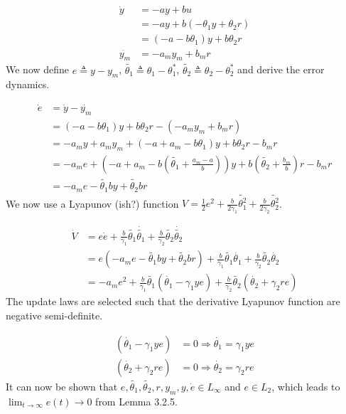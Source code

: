 \begin{equation}
\begin{split}
\dot{y} &= -ay +bu \\
& =-ay + b (-\theta_1 y + \theta_2 r) \\
& = (-a- b \theta_1) y + b \theta_2 r \\
\dot{y_m} &= -a_m y_m + b_m r
\end{split}
\end{equation}
We now define $e \triangleq y - y_m$, $\tilde{\theta_1}  \triangleq \theta_1 - \theta_1^*$, $\tilde{\theta_2}  \triangleq \theta_2 - \theta_2^*$ and derive the error dynamics.

\begin{equation}
\begin{split}
\dot{e} &= \dot{y}-\dot{y_m} \\
&= (-a- b \theta_1) y + b \theta_2 r - ( -a_m y_m + b_m r ) \\
&= -a_m y +  a_m y_m + (-a + a_m- b \theta_1) y + b \theta_2 r - b_m r \\
&= -a_m e + (-a + a_m- b (\tilde{\theta_1} +\frac{a_m-a}{b})) y + b (\tilde{\theta_2} + \frac{b_m}{b})r - b_m r \\
&= -a_m e - \tilde{\theta_1}b y + \tilde{\theta_2}b r
\end{split}
\end{equation}
We now use a Lyapunov (ish?) function $V = \frac{1}{2}e^2 + \frac{b}{2\gamma_1}\tilde{\theta_1^2} + \frac{b}{2\gamma_2}\tilde{\theta_2^2} $.

\begin{equation}
\begin{split}
\dot{V} &= e\dot{e} 	+ \frac{b}{\gamma_1}\tilde{\theta_1}\dot{\tilde{\theta_1}} 
				+ \frac{b}{\gamma_2} \tilde{\theta_2}\dot{\tilde{\theta_2}} \\
&= 	e (-a_m e - \tilde{\theta_1}b y + \tilde{\theta_2}b r) 
	+ \frac{b}{\gamma_1}\tilde{\theta_1}\dot{\theta_1} 
	+ \frac{b}{\gamma_2}\tilde{\theta_2}\dot{\theta_2} \\
&= -a_m e^2 	+ \frac{b}{\gamma_1}\tilde{\theta_1}(\dot{\theta_1}  - \gamma_1 y e)
			+ \frac{b}{\gamma_2}\tilde{\theta_2}(\dot{\theta_2} + \gamma_2 r e )
\end{split}
\end{equation}
The update laws are selected such that the derivative Lyapunov function are negative semi-definite.

\begin{equation}
\begin{split}
(\dot{\theta_1}  - \gamma_1 y e) &= 0 \Rightarrow \dot{\theta_1} = \gamma_1 y e \\
(\dot{\theta_2} + \gamma_2 r e ) &= 0 \Rightarrow \dot{\theta_2} = \gamma_2 r e
\end{split}
\end{equation}
It can now be shown that $e,\tilde{\theta_1}, \tilde{\theta_2},r,y_m,y,\dot{e} \in L_\infty$ and $e \in L_2$, which leads to $\lim_{t \to \infty} e(t) \rightarrow 0$ from Lemma 3.2.5.